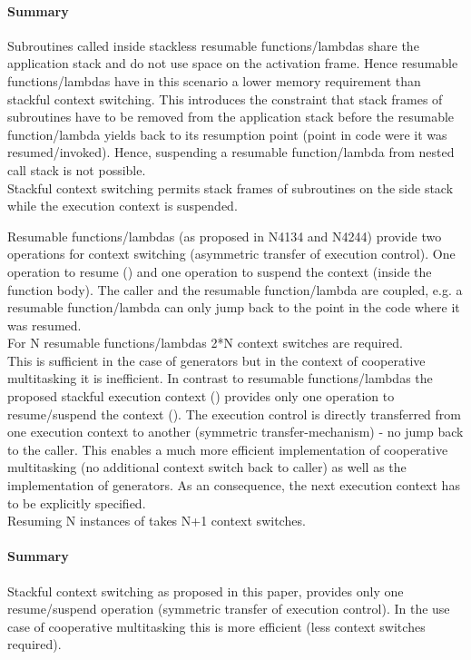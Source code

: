 \paragraph*{Summary}
Subroutines called inside stackless resumable functions/lambdas share the
application stack and do not use space on the activation frame. Hence resumable
functions/lambdas have in this scenario a lower memory requirement than stackful
context switching. This introduces the constraint that stack frames of
subroutines have to be removed from the application stack before the resumable
function/lambda yields back to its resumption point (point in code were it was
resumed/invoked). Hence, suspending a resumable function/lambda from nested call
stack is not possible.\\
Stackful context switching permits stack frames of subroutines on the side stack
while the execution context is suspended.

Resumable functions/lambdas (as proposed in N4134 and N4244) provide two
operations for context switching (asymmetric transfer of execution control).
One operation to resume () and one operation to suspend the
context (\yield inside the function body). The caller and the resumable
function/lambda are coupled, e.g. a resumable function/lambda can only jump back
to the point in the code where it was resumed.\\
\newline
For N resumable functions/lambdas 2*N context switches are required.\\
This is sufficient in the case of generators but in the context of cooperative
multitasking it is inefficient.
In contrast to resumable functions/lambdas the proposed stackful execution
context (\ectx) provides only one operation to resume/suspend the context
(\ectxop). The execution control is directly transferred from one
execution context to another (symmetric transfer-mechanism) - no jump back to
the caller. This enables a much more efficient implementation of cooperative
multitasking (no additional context switch back to caller) as well as the
implementation of generators. As an consequence, the next execution context has
to be explicitly specified.\\
\newline
Resuming N instances of \ectx takes N+1 context switches.
\paragraph*{Summary}
Stackful context switching as proposed in this paper, provides only one
resume/suspend operation (symmetric transfer of execution control). In the use
case of cooperative multitasking this is more efficient (less context switches
required).

